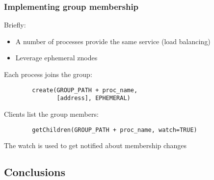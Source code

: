 \documentclass{beamer}
\begin{document}
\begin{frame}[fragile]
	\frametitle{Implementing group membership}
	Briefly:
	\begin{itemize}
		\item A number of processes provide the same service (load balancing)
		\item Leverage ephemeral znodes
	\end{itemize}
	
	\vspace{7pt}
	
	Each process joins the group:
	\begin{verbatim}
		create(GROUP_PATH + proc_name,
		       [address], EPHEMERAL)
	\end{verbatim}

	Clients list the group members:
	\begin{verbatim}
		getChildren(GROUP_PATH + proc_name, watch=TRUE)
	\end{verbatim}
	The watch is used to get notified about membership changes
\end{frame}

\subsection{Conclusions}
\end{document}
